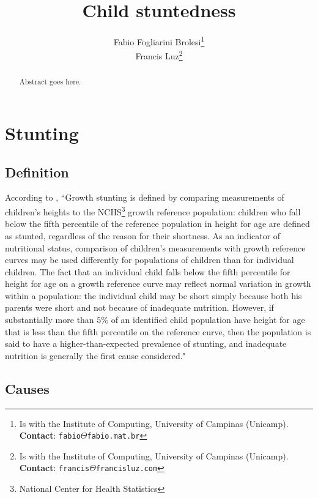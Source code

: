 \documentclass[10pt,twocolumn,letterpaper]{article}
\begin{document}

\title{Child stuntedness}
\author{Fabio Fogliarini Brolesi\thanks{Is with the Institute of Computing, University of Campinas (Unicamp). \textbf{Contact}: \tt\small{fabio$\Theta$fabio.mat.br}}\\
Francis Luz\thanks{Is with the Institute of Computing, University of Campinas (Unicamp). \textbf{Contact}: \tt\small{francis$\Theta$francisluz.com}}
}

\maketitle
\begin{abstract}
Abstract goes here.
\end{abstract}

\section{Stunting}
\subsection{Definition}
According to \cite{Lewit}, ``Growth stunting is defined by comparing measurements of children's heights to the NCHS\footnote{National Center for Health Statistics} growth reference population: children who fall below the fifth percentile of the reference population in height for age are defined as stunted, regardless of the reason for their shortness. As an indicator of nutritional status, comparison of children's measurements with growth reference curves may be used differently for populations of children than for individual children. The fact that an individual child falls below the fifth percentile for height for age on a growth reference curve may reflect normal variation in growth within a population: the individual child may be short simply because both his parents were short and not because of inadequate nutrition. However, if substantially more than $5\%$ of an identified child population have height for age that is less than the fifth percentile on the reference curve, then the population is said to have a higher-than-expected prevalence of stunting, and inadequate nutrition is generally the first cause considered."

\subsection {Causes}
\end{document}
